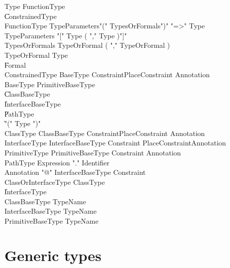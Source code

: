\begin{grammar}
Type \: FunctionType \\
    \| ConstrainedType  \\

FunctionType \: TypeParameters\opt \xcd"(" TypesOrFormals\opt \xcd")" \xcd"=>" Type  \\
TypeParameters \: \xcd"[" Type ( \xcd"," Type )\star \xcd"]" \\
TypesOrFormals \: TypeOrFormal ( \xcd"," TypeOrFormal )\star \\
TypeOrFormal   \: Type \\
               \| Formal \\

ConstrainedType \: BaseType Constraint\opt PlaceConstraint\opt
Annotation\star \\

BaseType \: PrimitiveBaseType \\
     \| ClassBaseType \\
     \| InterfaceBaseType \\
     \| PathType \\
     \| \xcd"(" Type \xcd")" \\

ClassType \: ClassBaseType Constraint\opt PlaceConstraint\opt
Annotation\star \\
InterfaceType \: InterfaceBaseType Constraint\opt
PlaceConstraint\opt Annotation\star \\
PrimitiveType \: PrimitiveBaseType Constraint\opt
Annotation\star \\

PathType \: Expression \xcd"." Identifier \\

Annotation \: \xcd"@" InterfaceBaseType Constraint\opt \\

ClassOrInterfaceType \: ClassType \\ \| InterfaceType \\
ClassBaseType \: TypeName \\
InterfaceBaseType \: TypeName \\
PrimitiveBaseType \: TypeName \\
\end{grammar}

\section{Generic types}

